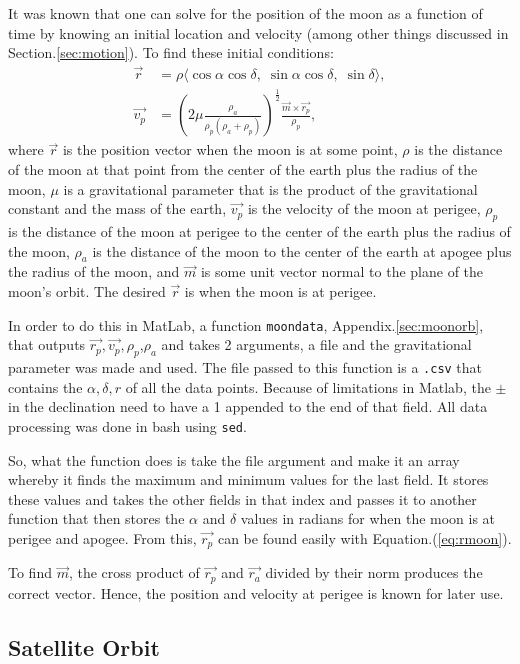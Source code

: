 \documentclass{article}
\begin{document}
It was known that one can solve for the position of the moon as a
function of time by knowing an initial location and velocity (among
other things discussed in Section.\ref{sec:motion}). To find these initial conditions:
\begin{align}
  \vec{r} &= \rho \langle \cos{\alpha}\cos{\delta}, \;
  \sin{\alpha}\cos{\delta}, \; \sin{\delta} \rangle
  \label{eq:rmoon}, \\
  \vec{v_p} &=
  (2\mu\frac{\rho_a}{\rho_p(\rho_a+\rho_p)})^{\frac{1}{2}}
  \frac{\vec{m}\times\vec{r_p}}{\rho_p},
\end{align}
where $\vec{r}$ is the position vector when the moon is at some point,
$\rho$ is the distance of the moon at that point from the center of
the earth plus the radius of the moon,
$\mu$ is a gravitational parameter that
is the product of the gravitational constant and the mass of the
earth, $\vec{v_p}$ is the velocity of the moon at perigee,
$\rho_p$ is the distance of the moon at perigee to the center
of the earth plus the radius of the moon, $\rho_a$ is the distance of the moon to the center of the earth
at apogee plus the radius of the moon, and $\vec{m}$ is some unit vector normal to the plane of the
moon's orbit. The desired $\vec{r}$ is when the moon is at perigee.

In order to do this in MatLab, a function \verb[moondata[, Appendix.\ref{sec:moonorb}, that
outputs $\vec{r_p}, \vec{v_p}, \rho_p$,$\rho_a$ and takes 2 arguments,
a file and the gravitational parameter was made and used.
The file passed to this function
is a \verb[.csv[ that contains the $\alpha,\delta,r$ of all the
data points. Because of limitations in Matlab, the $\pm$ in the
declination need to have a 1 appended to the end of that field. All
data processing was done in bash using \verb[sed[.

So, what the function does is take the file argument and make it an
array whereby it finds the maximum and minimum values for the last
field. It stores these values and takes the other fields in that index
and passes it to another function that then stores the $\alpha$ and
$\delta$ values in radians for when the moon is at perigee and apogee.
From this, $\vec{r_p}$ can be found easily with Equation.(\ref{eq:rmoon}).

To find $\vec{m}$, the cross product of $\vec{r_p}$ and $\vec{r_a}$
divided by their norm produces the correct vector. Hence, the position
and velocity at perigee is known for later use.

\subsection{Satellite Orbit}
\end{document}
